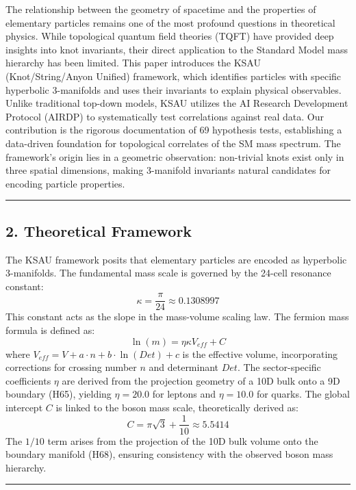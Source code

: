 \documentclass[
]{article}
\begin{document}
The relationship between the geometry of spacetime and the properties of
elementary particles remains one of the most profound questions in
theoretical physics. While topological quantum field theories (TQFT)
have provided deep insights into knot invariants, their direct
application to the Standard Model mass hierarchy has been limited. This
paper introduces the KSAU (Knot/String/Anyon Unified) framework, which
identifies particles with specific hyperbolic 3-manifolds and uses their
invariants to explain physical observables. Unlike traditional top-down
models, KSAU utilizes the AI Research Development Protocol (AIRDP) to
systematically test correlations against real data. Our contribution is
the rigorous documentation of 69 hypothesis tests, establishing a
data-driven foundation for topological correlates of the SM mass
spectrum. The framework's origin lies in a geometric observation:
non-trivial knots exist only in three spatial dimensions, making
3-manifold invariants natural candidates for encoding particle
properties.

\begin{center}\rule{0.5\linewidth}{0.5pt}\end{center}

\subsection{2. Theoretical Framework}\label{theoretical-framework}

The KSAU framework posits that elementary particles are encoded as
hyperbolic 3-manifolds. The fundamental mass scale is governed by the
24-cell resonance constant:
\[\kappa = \frac{\pi}{24} \approx 0.1308997\] This constant acts as the
slope in the mass-volume scaling law. The fermion mass formula is
defined as: \[\ln(m) = \eta \kappa V_{eff} + C\] where
\(V_{eff} = V + a \cdot n + b \cdot \ln(Det) + c\) is the effective
volume, incorporating corrections for crossing number \(n\) and
determinant \(Det\). The sector-specific coefficients \(\eta\) are
derived from the projection geometry of a 10D bulk onto a 9D boundary
(H65), yielding \(\eta = 20.0\) for leptons and \(\eta = 10.0\) for
quarks. The global intercept \(C\) is linked to the boson mass scale,
theoretically derived as:
\[C = \pi\sqrt{3} + \frac{1}{10} \approx 5.5414\] The \(1/10\) term
arises from the projection of the 10D bulk volume onto the boundary
manifold (H68), ensuring consistency with the observed boson mass
hierarchy.

\begin{center}\rule{0.5\linewidth}{0.5pt}\end{center}
\end{document}
